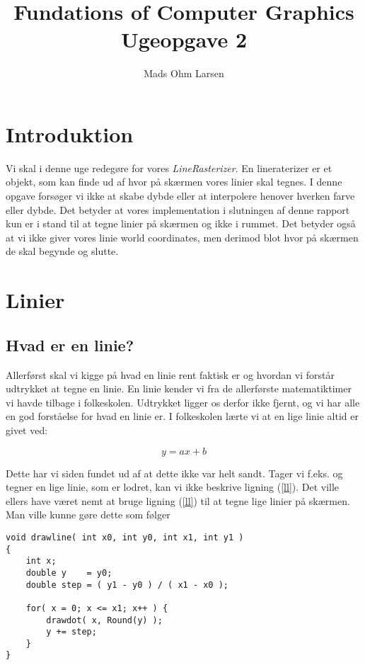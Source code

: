 \documentclass[a4paper, 10pt]{article}
\title{Fundations of Computer Graphics\\ Ugeopgave 2}
\author{Mads Ohm Larsen}
\begin{document}
\maketitle

\section{Introduktion}
Vi skal i denne uge redegøre for vores \textit{LineRasterizer}.
En lineraterizer er et objekt, som kan finde ud af hvor på skærmen vores linier skal tegnes.
I denne opgave forsøger vi ikke at skabe dybde eller at interpolere henover hverken farve eller dybde.
Det betyder at vores implementation i slutningen af denne rapport kun er i stand til at tegne linier på skærmen og ikke i rummet.
Det betyder også at vi ikke giver vores linie world coordinates, men derimod blot hvor på skærmen de skal begynde og slutte.

\section{Linier}
\subsection{Hvad er en linie?}
Allerførst skal vi kigge på hvad en linie rent faktisk er og hvordan vi forstår udtrykket at tegne en linie.
En linie kender vi fra de allerførste matematiktimer vi havde tilbage i folkeskolen.
Udtrykket ligger os derfor ikke fjernt, og vi har alle en god forståelse for hvad en linie er.
I folkeskolen lærte vi at en lige linie altid er givet ved:

\begin{equation}
y = ax + b \label{ll}
\end{equation}

Dette har vi siden fundet ud af at dette ikke var helt sandt.
Tager vi f.eks. og tegner en lige linie, som er lodret, kan vi ikke beskrive ligning (\ref{ll}).
Det ville ellers have været nemt at bruge ligning (\ref{ll}) til at tegne lige linier på skærmen.
Man ville kunne gøre dette som følger

\lstset{language=C, basicstyle=\footnotesize, numbers=left, stepnumber=2, numberstyle=\tiny, frameround=tttt, frame=tlBR, captionpos=b}
\begin{lstlisting}
void drawline( int x0, int y0, int x1, int y1 )
{
    int x;
    double y    = y0;
    double step = ( y1 - y0 ) / ( x1 - x0 );

    for( x = 0; x <= x1; x++ ) {
        drawdot( x, Round(y) );
        y += step;
    }
}
\end{lstlisting}
\end{document}
